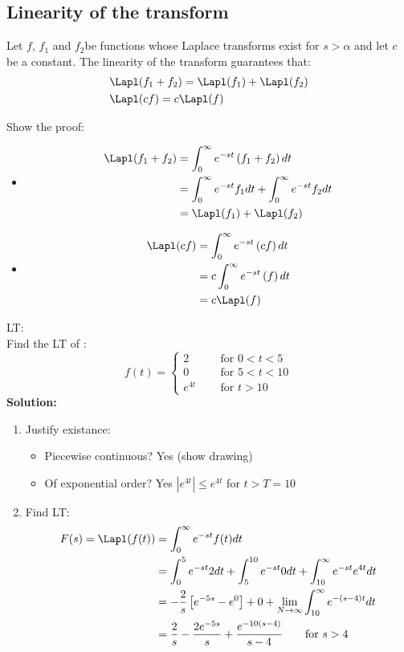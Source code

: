 \subsection{Linearity of  the transform}
Let $f$, $f_1$ and $f_2$be functions whose Laplace transforms exist for $s>\alpha$ and let $c$ be a constant. The linearity of the transform guarantees that:
\begin{align*}
&\Lapl (f_1+f_2)=\Lapl(f_1)+\Lapl(f_2)\\
&\Lapl (cf)=c\Lapl(f)
\end{align*}

Show the proof:
\begin{itemize}
\item 
\begin{align*}
\Lapl (f_1+f_2)&=\int^\infty_0 e^{-st}\left(f_1+f_2\right) dt\\
&=\int^\infty_0 e^{-st}f_1 dt+\int^\infty_0 e^{-st}f_2 dt\\
&=\Lapl(f_1)+\Lapl(f_2)
\end{align*}
\item 

\begin{align*}
\Lapl (cf)&=\int^\infty_0 e^{-st}\left(cf\right) dt\\
&=c\int^\infty_0 e^{-st}\left(f\right) dt\\
&=c\Lapl(f)
\end{align*}
\end{itemize}


\begin{exmp}{LT:}\\
Find the LT of :
\begin{equation*}
f(t)=
\begin{cases}
   2 \qquad &\text{for } 0<t<5\\
   0  &\text{for } 5<t<10 \\
   e^{4t} &\text{for } t>10
\end{cases}
\end{equation*}
\textbf{Solution:}\\
\begin{enumerate}
\item Justify existance:
\begin{itemize}
\item Piecewise continuous? Yes (show drawing)
\item Of exponential order? Yes $\left|e^{4t}\right|\leq e^{4t}$ for $t>T=10$
\end{itemize}
\item Find LT:\\
\begin{align*}
F(s)=\Lapl(f(t))&=\int^\infty_0e^{-st}f(t) dt\\
&=\int^5_0e^{-st}2dt+\int^{10}_5 e^{-st} 0 dt + \int^\infty_{10} e^{-st} e^{4t}dt\\
&=-\frac{2}{s}\left[e^{-5s}-e^{0}\right]+0+\lim_{N\rightarrow \infty} \int^\infty_{10} e^{-(s-4)t}dt\\
&=\frac{2}{s}-\frac{2e^{-5s}}{s}+ \frac{e^{-10(s-4)}}{s-4} \qquad \text{for }s>4\\
\end{align*}

\end{enumerate}
\end{exmp}
